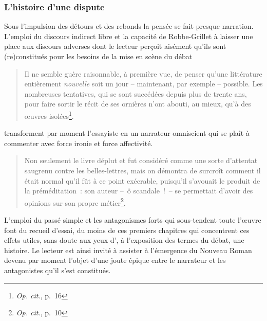 \documentclass[12pt, a4paper]{article}
\begin{document}


\subsubsection{L'histoire d'une dispute}
\label{histoireDispute}
Sous l'impulsion des détours et des rebonds la pensée se fait presque narration. L'emploi du discours indirect libre et la capacité de Robbe-Grillet à laisser une place aux discours adverses dont le lecteur perçoit aisément qu'ils sont (re)constitués pour les besoins de la mise en scène du débat~
\begin{quote}
    Il ne semble guère raisonnable, à première vue, de penser qu’une littérature entièrement \textit{nouvelle} soit un jour – maintenant, par exemple – possible. Les nombreuses tentatives, qui se sont succédées depuis plus de trente ans, pour faire sortir le récit de ses ornières n’ont abouti, au mieux, qu’à des œuvres isolées\footnote{\textit{Op. cit.}, p.~16}.
\end{quote}transforment par moment l'essayiste en un narrateur omniscient qui se plaît à commenter avec force ironie et force affectivité.
\begin{quote}
    Non seulement le livre déplut et fut considéré comme une sorte d’attentat saugrenu contre les belles-lettres, mais on démontra de surcroît comment il était normal qu’il fût à ce point exécrable, puisqu’il s’avouait le produit de la préméditation~: son auteur –~ô scandale~!~– se permettait d’avoir des opinions sur son propre métier\footnote{\textit{Op. cit.}, p.~10}.
\end{quote}
L'emploi du passé simple et les antagonismes forts qui sous-tendent toute l'œuvre font du recueil d'essai, du moins de ces premiers chapitres qui concentrent ces effets utiles, sans doute aux yeux d'\robbe{}, à l'exposition des termes du débat, une histoire. Le lecteur est ainsi invité à assister à l'émergence du Nouveau Roman devenu par moment l'objet d'une joute épique entre le narrateur et les antagonistes qu'il s'est constitués.
\end{document}
